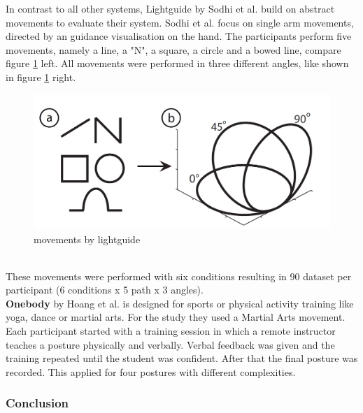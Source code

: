 In contrast to all other systems, Lightguide by Sodhi et al. \cite{Sodhi2012} build on abstract movements to evaluate their system. Sodhi et al. focus on single arm movements, directed by an guidance visualisation on the hand. The participants perform five movements, namely a line, a "N", a square, a circle and a bowed line, compare figure \ref{fig:lightguide1} left. All movements were performed in three different angles, like shown in figure \ref{fig:lightguide1} right.
\begin{figure}
	\centering
	\includegraphics[width=1.0\textwidth]{img/lightguide_movements.PNG}
	\caption{movements by lightguide \cite{Sodhi2012}}
	\label{fig:lightguide1}
\end{figure}\\
\todo These movements were performed with six conditions resulting in 90 dataset per participant (6 conditions x 5 path x 3 angles).\\
\textbf{Onebody} by Hoang et al. \cite{Hoang2016} is designed for sports or physical activity training like yoga, dance or martial arts. For the study they used a Martial Arts movement. Each participant started with a training session in which a remote instructor teaches a posture physically and verbally. Verbal feedback was given and the training repeated until the student was confident. After that the final posture was recorded. This applied for four postures with different complexities.\\

\subsubsection{Conclusion}


